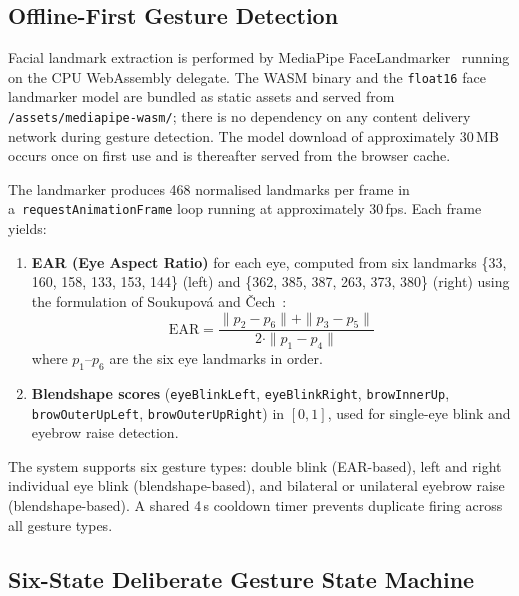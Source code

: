 \subsection{Offline-First Gesture Detection}
\label{sec:detection}

Facial landmark extraction is performed by MediaPipe
FaceLandmarker~\cite{lugaresi2019mediapipe} running on the CPU WebAssembly delegate.
The WASM binary and the \texttt{float16} face landmarker model are bundled as static
assets and served from \texttt{/assets/mediapipe-wasm/}; there is no dependency on any
content delivery network during gesture detection. The model download of approximately
30\,MB occurs once on first use and is thereafter served from the browser cache.

The landmarker produces 468 normalised landmarks per frame in a~\texttt{requestAnimation\-Frame} loop
running at approximately 30\,fps. Each frame yields:
\begin{enumerate}
  \item \textbf{EAR (Eye Aspect Ratio)} for each eye, computed from six landmarks
    \{33, 160, 158, 133, 153, 144\} (left) and \{362, 385, 387, 263, 373, 380\}
    (right) using the formulation of Soukupov{\'a} and {\v{C}}ech~\cite{soukupova2016}:
    \begin{equation}
      \text{EAR} = \frac{\|p_2 - p_6\| + \|p_3 - p_5\|}{2 \cdot \|p_1 - p_4\|}
      \label{eq:ear}
    \end{equation}
    where $p_1$--$p_6$ are the six eye landmarks in order.
  \item \textbf{Blendshape scores} (\texttt{eyeBlinkLeft}, \texttt{eyeBlinkRight},
    \texttt{browInnerUp}, \texttt{browOuterUpLeft}, \texttt{browOuterUpRight}) in $[0,1]$,
    used for single-eye blink and eyebrow raise detection.
\end{enumerate}

The system supports six gesture types: double blink (EAR-based), left and right individual
eye blink (blendshape-based), and bilateral or unilateral eyebrow raise
(blendshape-based). A shared 4\,s cooldown timer prevents duplicate firing across all
gesture types.

\subsection{Six-State Deliberate Gesture State Machine}
\label{sec:statemachine}

